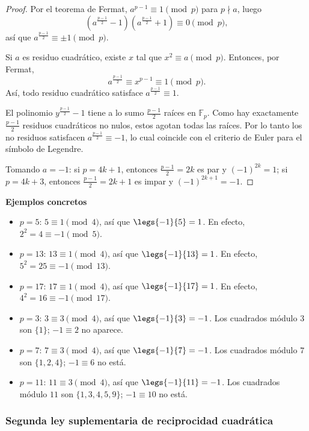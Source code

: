 \begin{proof}
Por el teorema de Fermat, $a^{p-1}\equiv 1\pmod p$ para $p \nmid a$, luego
\[
\left(a^{\frac{p-1}{2}}-1\right)\left(a^{\frac{p-1}{2}}+1\right)\equiv 0 \pmod p,
\]
así que $a^{\frac{p-1}{2}}\equiv \pm 1 \pmod p$.

Si $a$ es residuo cuadrático, existe $x$ tal que $x^2\equiv a\pmod p$. Entonces, por Fermat,
\[
a^{\frac{p-1}{2}} \equiv x^{p-1} \equiv 1 \pmod p.
\]
Así, todo residuo cuadrático satisface $a^{\frac{p-1}{2}}\equiv 1$.

El polinomio $y^{\frac{p-1}{2}}-1$ tiene a lo sumo $\frac{p-1}{2}$ raíces en $\mathbb{F}_p$. Como hay exactamente $\frac{p-1}{2}$ residuos cuadráticos no nulos, estos agotan todas las raíces. Por lo tanto los no residuos satisfacen $a^{\frac{p-1}{2}}\equiv -1$, lo cual coincide con el criterio de Euler para el símbolo de Legendre.

Tomando $a=-1$: si $p=4k+1$, entonces $\frac{p-1}{2}=2k$ es par y $(-1)^{2k}=1$; si $p=4k+3$, entonces $\frac{p-1}{2}=2k+1$ es impar y $(-1)^{2k+1}=-1$.
\end{proof}

\noindent\textbf{Ejemplos concretos}

\begin{itemize}
  \item $p = 5$: $5 \equiv 1 \pmod 4$, así que $\legs{-1}{5} = 1$. En efecto, $2^2 = 4 \equiv -1 \pmod 5$.
  \item $p = 13$: $13 \equiv 1 \pmod 4$, así que $\legs{-1}{13} = 1$. En efecto, $5^2 = 25 \equiv -1 \pmod{13}$.
  \item $p = 17$: $17 \equiv 1 \pmod 4$, así que $\legs{-1}{17} = 1$. En efecto, $4^2 = 16 \equiv -1 \pmod{17}$.
  \item $p = 3$: $3 \equiv 3 \pmod 4$, así que $\legs{-1}{3} = -1$. Los cuadrados módulo $3$ son $\{1\}$; $-1 \equiv 2$ no aparece.
  \item $p = 7$: $7 \equiv 3 \pmod 4$, así que $\legs{-1}{7} = -1$. Los cuadrados módulo $7$ son $\{1,2,4\}$; $-1 \equiv 6$ no está.
  \item $p = 11$: $11 \equiv 3 \pmod 4$, así que $\legs{-1}{11} = -1$. Los cuadrados módulo $11$ son $\{1,3,4,5,9\}$; $-1 \equiv 10$ no está.
\end{itemize}

\subsubsection{Segunda ley suplementaria de reciprocidad cuadrática}

